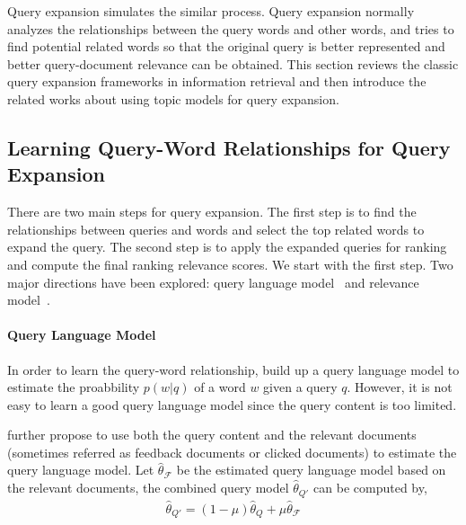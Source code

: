 Query expansion simulates the similar process. Query expansion normally analyzes the relationships between the query words and other words, and tries to find potential related words so that the original query is better represented and better query-document relevance can be obtained. This section reviews the classic query expansion frameworks in information retrieval and then introduce the related works about using topic models for query expansion. 

\subsection{Learning Query-Word Relationships for Query Expansion}

There are two main steps for query expansion. The first step is to find the relationships between queries and words and select the top related words to expand the query. The second step is to apply the expanded queries for ranking and compute the final ranking relevance scores. We start with the first step. Two major directions have been explored: query language model~\citep{zhai-01b} and relevance model~\citep{Lavrenko-2001}.

\paragraph{Query Language Model}

In order to learn the query-word relationship, \cite{zhai-01b} build up a query language model to estimate the proabbility $p(w|q)$ of a word $w$ given a query $q$. However, it is not easy to learn a good query language model since the query content is too limited. 

\cite{zhai-01b} further propose to use both the query content and the relevant documents (sometimes referred as feedback documents or clicked documents) to estimate the query language model. Let $\hat{\theta}_{\mathcal{F}}$ be the estimated query language model based on the relevant documents, the combined query model $\hat{\theta}_{Q'}$ can be computed by,
\begin{align}
\hat{\theta}_{Q'} = (1 - \mu)\hat{\theta}_{Q} + \mu \hat{\theta}_{\mathcal{F}}
\end{align}


